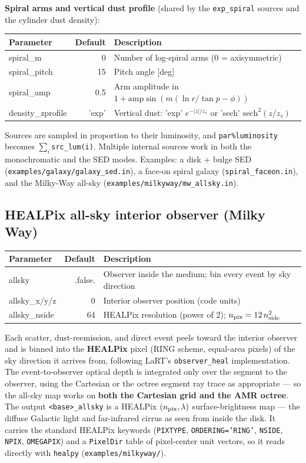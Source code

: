 \documentclass[english,a4paper]{kiseon_memo}
\newcommand{\pp}[1]{\texttt{par\%#1}}
\newcommand{\code}[1]{\texttt{#1}}
\newcommand{\file}[1]{\texttt{#1}}
\begin{document}
\medskip\noindent\textbf{Spiral arms and vertical dust profile} (shared by the
\code{exp\_spiral} sources and the cylinder dust density):
\begin{longtable}{P D X}
\toprule
\textrm{Parameter} & \textrm{Default} & \textrm{Description}\\
\midrule \endhead
spiral\_m          & 0       & Number of log-spiral arms (0 = axisymmetric)\\
spiral\_pitch      & 15      & Pitch angle [deg]\\
spiral\_amp        & 0.5     & Arm amplitude in $1+\mathrm{amp}\sin(m(\ln r/\tan p-\phi))$\\
density\_zprofile  & 'exp'   & Vertical dust: 'exp' $e^{-|z|/z_s}$ or 'sech' $\mathrm{sech}^2(z/z_s)$\\
\bottomrule
\end{longtable}
Sources are sampled in proportion to their luminosity, and \pp{luminosity}
becomes $\sum_i$\code{src\_lum(i)}.  Multiple internal sources work in both the
monochromatic and the SED modes.  Examples: a disk + bulge SED
(\file{examples/galaxy/galaxy\_sed.in}), a face-on spiral galaxy
(\file{spiral\_faceon.in}), and the Milky-Way all-sky
(\file{examples/milkyway/mw\_allsky.in}).

\subsection{HEALPix all-sky interior observer (Milky Way)}\label{sec:allsky}
\begin{longtable}{P D X}
\toprule
\textrm{Parameter} & \textrm{Default} & \textrm{Description}\\
\midrule \endhead
allsky             & .false. & Observer inside the medium; bin every event by sky direction\\
allsky\_x/y/z      & 0       & Interior observer position (code units)\\
allsky\_nside      & 64      & HEALPix resolution (power of 2); $n_{\rm pix}=12\,n_{\rm side}^2$\\
\bottomrule
\end{longtable}
Each scatter, dust-reemission, and direct event peels toward the interior
observer and is binned into the \textbf{HEALPix} pixel (RING scheme,
equal-area pixels) of the sky direction it arrives from, following LaRT's
\code{observer\_heal} implementation.  The event-to-observer optical depth is
integrated only over the segment to the observer, using the Cartesian or the
octree segment ray trace as appropriate --- so the all-sky map works on
\textbf{both the Cartesian grid and the AMR octree}.  The output
\file{<base>\_allsky} is a HEALPix $(n_{\rm pix},\lambda)$ surface-brightness
map --- the diffuse Galactic light and far-infrared cirrus as seen from inside
the disk.  It carries the standard HEALPix keywords (\code{PIXTYPE},
\code{ORDERING='RING'}, \code{NSIDE}, \code{NPIX}, \code{OMEGAPIX}) and a
\code{PixelDir} table of pixel-center unit vectors, so it reads directly with
\code{healpy} (\file{examples/milkyway/}).
\end{document}
